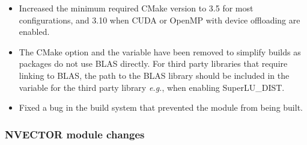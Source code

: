 \begin{itemize}
\item Increased the minimum required CMake version to 3.5 for most {\sundials}
configurations, and 3.10 when CUDA or OpenMP with device offloading are enabled.
%
\item The CMake option  and the variable  have
been removed to simplify builds as {\sundials} packages do not use BLAS
directly. For third party libraries that require linking to BLAS, the path to
the BLAS library should be included in the  variable for the
third party library \textit{e.g.},  when enabling
SuperLU\_DIST.
%
\item Fixed a bug in the build system that prevented the {\nvecpthreads} module from
being built.
\end{itemize}

\subsubsection*{NVECTOR module changes}

